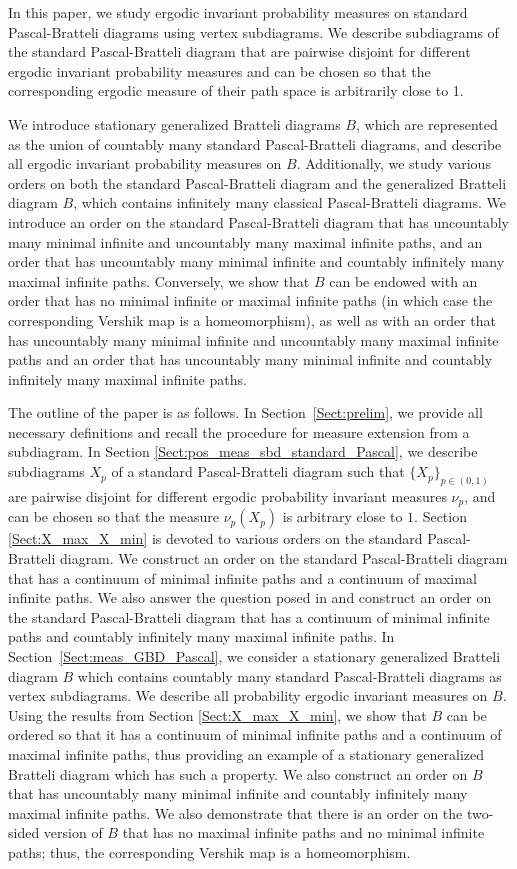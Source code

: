 \documentclass[11pt, twoside]{amsart}
\theoremstyle{definition}
\theoremstyle{remark}
\theoremstyle{plain}
\numberwithin{equation}{section}
\begin{document}
In this paper, we study ergodic invariant probability measures on standard Pascal-Bratteli diagrams using vertex subdiagrams. We describe subdiagrams of the standard Pascal-Bratteli diagram that are pairwise disjoint for different ergodic invariant probability measures and can be chosen so that the corresponding ergodic measure of their path space is arbitrarily close to 1.

We introduce stationary generalized Bratteli diagrams $B$, which are represented as the union of countably many standard Pascal-Bratteli diagrams, and describe all ergodic invariant probability measures on $B$. Additionally, we study various orders on both the standard Pascal-Bratteli diagram and the generalized Bratteli diagram $B$, which contains infinitely many classical Pascal-Bratteli diagrams. We introduce an order on the standard Pascal-Bratteli diagram that has uncountably many minimal infinite and uncountably many maximal infinite paths, and an order that has uncountably many minimal infinite and countably infinitely many maximal infinite paths. Conversely, we show that $B$ can be endowed with an order that has no minimal infinite or maximal infinite paths (in which case the corresponding Vershik map is a homeomorphism), as well as with an order that has uncountably many minimal infinite and uncountably many maximal infinite paths and an order that has uncountably many minimal infinite and countably infinitely many maximal infinite paths.

The outline of the paper is as follows.
In Section~\ref{Sect:prelim}, we provide all necessary definitions and recall the procedure for measure extension from a subdiagram.
 In Section \ref{Sect:pos_meas_sbd_standard_Pascal}, we describe subdiagrams $X_p$ of a standard Pascal-Bratteli diagram such that $\{X_p\}_{p\in (0,1)}$ are pairwise disjoint for different ergodic probability invariant measures $\nu_p$, and can be chosen so that the measure $\nu_p (X_p)$ is arbitrary close to $1$. 
Section \ref{Sect:X_max_X_min} is devoted to various orders on the standard Pascal-Bratteli diagram. We construct an order on the standard Pascal-Bratteli diagram that has a continuum of minimal infinite paths and a continuum of maximal infinite paths. We also answer the question posed in \cite{Fricketal2017} and construct an order on the standard Pascal-Bratteli diagram that has a continuum of minimal infinite paths and countably infinitely many maximal infinite paths. 
In Section~\ref{Sect:meas_GBD_Pascal},
we consider a stationary generalized Bratteli diagram $B$ which contains countably many standard Pascal-Bratteli diagrams as vertex subdiagrams.
We describe all probability ergodic invariant measures on $B$. Using the results from Section \ref{Sect:X_max_X_min}, we show that $B$ can be ordered so that it has
 a continuum of minimal infinite paths and a continuum of maximal infinite paths, thus providing an example of a stationary generalized Bratteli diagram which has such a property. We also construct an order on $B$ that has uncountably many minimal infinite and countably infinitely many maximal infinite paths. We also demonstrate that there is an order on the two-sided version of $B$ that has no maximal infinite paths and no minimal infinite paths; thus, the corresponding Vershik map is a homeomorphism. 
\end{document}
